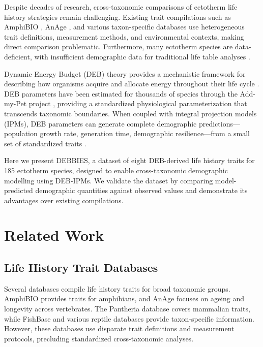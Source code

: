 \documentclass[11pt]{article}
\begin{document}
Despite decades of research, cross-taxonomic comparisons of ectotherm life history strategies remain challenging. Existing trait compilations such as AmphiBIO \citep{oliveira2017}, AnAge \citep{tacutu2018}, and various taxon-specific databases use heterogeneous trait definitions, measurement methods, and environmental contexts, making direct comparison problematic. Furthermore, many ectotherm species are data-deficient, with insufficient demographic data for traditional life table analyses \citep{conde2019}.

Dynamic Energy Budget (DEB) theory provides a mechanistic framework for describing how organisms acquire and allocate energy throughout their life cycle \citep{kooijman2010}. DEB parameters have been estimated for thousands of species through the Add-my-Pet project \citep{marques2018}, providing a standardized physiological parameterization that transcends taxonomic boundaries. When coupled with integral projection models (IPMs), DEB parameters can generate complete demographic predictions---population growth rate, generation time, demographic resilience---from a small set of standardized traits \citep{smallegange2017}.

Here we present DEBBIES, a dataset of eight DEB-derived life history traits for 185 ectotherm species, designed to enable cross-taxonomic demographic modelling using DEB-IPMs. We validate the dataset by comparing model-predicted demographic quantities against observed values and demonstrate its advantages over existing compilations.

\section{Related Work}

\subsection{Life History Trait Databases}

Several databases compile life history traits for broad taxonomic groups. AmphiBIO \citep{oliveira2017} provides traits for amphibians, and AnAge \citep{tacutu2018} focuses on ageing and longevity across vertebrates. The Pantheria database \citep{jones2009} covers mammalian traits, while FishBase \citep{froese2010} and various reptile databases provide taxon-specific information. However, these databases use disparate trait definitions and measurement protocols, precluding standardized cross-taxonomic analyses.
\end{document}
